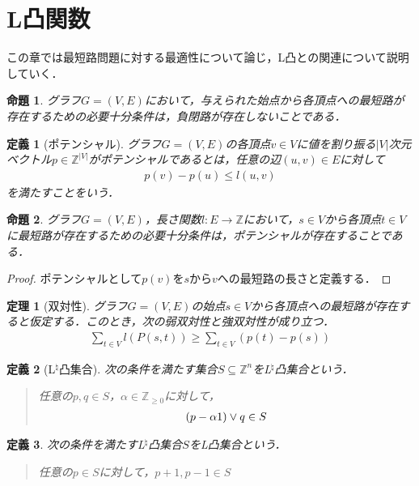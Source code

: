 \documentclass[a4paper]{jsarticle}
\newcommand{\paren}[1]{ \left( #1 \right) }
\newcommand{\abs}[1]{ \left| #1 \right| }
\newcommand{\Int}{\mathbb{Z}}
\theoremstyle{break}
\newtheorem{theo}{定理}[section]
\newtheorem{defi}{定義}[section]
\newtheorem{prop}{命題}[section]
\newtheorem{proof}{証明}[section]
\begin{document}
\section{L凸関数}
この章では最短路問題に対する最適性について論じ，L凸との関連について説明していく．
\begin{prop}
  グラフ$G=(V,E)$において，与えられた始点から各頂点への最短路が存在するための必要十分条件は，負閉路が存在しないことである．
\end{prop}
\begin{defi}[ポテンシャル] 
  グラフ$G=(V,E)$の各頂点$v\in V$に値を割り振る$\abs{V}$次元ベクトル$p \in \Int^{\abs{V}}$がポテンシャルであるとは，任意の辺$(u,v)\in E$に対して
  \begin{align*}
    p(v) - p(u) \leq l(u,v)
  \end{align*}
  を満たすことをいう．
\end{defi}
\begin{prop}
  グラフ$G=(V,E)$，長さ関数$l\colon E\to \Int$において，$s\in V$から各頂点$t\in V$に最短路が存在するための必要十分条件は，ポテンシャルが存在することである．
\end{prop}
\begin{proof}
  ポテンシャルとして$p(v)$を$s$から$v$への最短路の長さと定義する．
\end{proof}
\begin{theo}[双対性] 
  グラフ$G=(V,E)$の始点$s\in V$から各頂点への最短路が存在すると仮定する．このとき，次の弱双対性と強双対性が成り立つ．
  \begin{align*}
    \sum_{t\in V} l\paren{P(s,t)} \geq \sum_{t\in V} ( p(t) - p(s) )
  \end{align*}
\end{theo}
\begin{defi}[L${ }^\natural$凸集合] 
  次の条件を満たす集合$S\subseteq \Int^n$をL${ }^\natural$凸集合という．
  \begin{quote}
    任意の$p,q\in S$，$\alpha \in \Int_{\geq 0}$に対して，
    \begin{align*}
      (p-\alpha \boldmath{1}) \lor q \in S
    \end{align*}
  \end{quote}
\end{defi}
\begin{defi}
  次の条件を満たすL${}^\natural$凸集合$S$をL凸集合という．
  \begin{quote}
    任意の$p\in S$に対して，$p+1,p-1\in S$
  \end{quote}
\end{defi}
\end{document}
